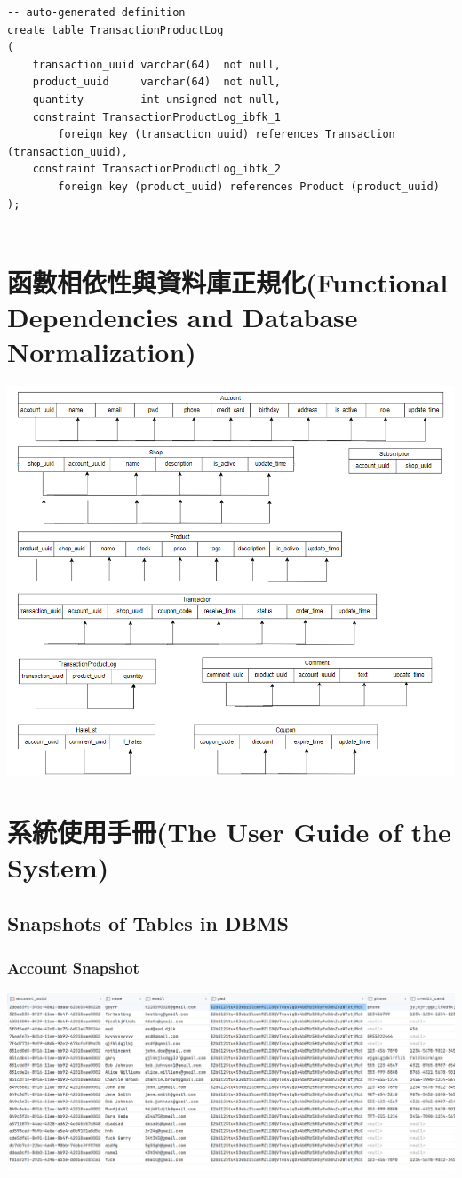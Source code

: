 \documentclass[a4paper, 12pt]{article}
\begin{document}
\begin{verbatim}
-- auto-generated definition
create table TransactionProductLog
(
    transaction_uuid varchar(64)  not null,
    product_uuid     varchar(64)  not null,
    quantity         int unsigned not null,
    constraint TransactionProductLog_ibfk_1
        foreign key (transaction_uuid) references Transaction (transaction_uuid),
    constraint TransactionProductLog_ibfk_2
        foreign key (product_uuid) references Product (product_uuid)
);


\end{verbatim}



\newpage
\section{函數相依性與資料庫正規化(Functional Dependencies and Database Normalization)}
\includegraphics[scale=0.5]{image/fd.png}
\section{系統使用手冊(The User Guide of the System)}
\subsection{Snapshots of Tables in DBMS}
\subsubsection{Account Snapshot}
\includegraphics[scale=0.4]{snapshots/account.png}
\end{document}
